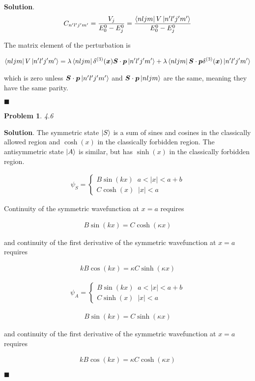 \documentclass[12pt]{article}
\newtheorem{p}{Problem}
\theoremstyle{definition}
\newenvironment{s}{%
        \begin{trivlist} \item \textbf{Solution}. }{%
            \hspace*{\fill} $\blacksquare$\end{trivlist}}%
\begin{document}
{\begin{s}
\begin{align*}
C_{n'l'j'm'} = \frac{V_{j}}{E_{0}^{0}-E_{j}^{0}} = \frac{\bra{nljm}V\ket{n'l'j'm'}}{E_{0}^{0}-E_{j}^{0}}
\end{align*}

The matrix element of the perturbation is 

\begin{align*}
\bra{nljm}V\ket{n'l'j'm'} = \lambda \bra{nljm}\delta^{(3)}(\bm{x})\bm{S}\cdot \bm{p}\ket{n'l'j'm'} + \lambda \bra{nljm}\bm{S}\cdot \bm{p}\delta^{(3)}(\bm{x})\ket{n'l'j'm'}
\end{align*}

which is zero unless $\bm{S}\cdot \bm{p}\ket{n'l'j'm'}$ and $\bm{S}\cdot \bm{p}\ket{nljm}$ are the same, meaning they have the same parity. 

\end{s}

\begin{p}
4.6
\end{p}

\begin{s}
The symmetric state $\ket{S}$ is a sum of sines and cosines in the classically allowed region and $\cosh (x)$ in the classically forbidden region. The antisymmetric state $\ket{A}$ is similar, but has $\sinh (x)$ in the classically forbidden region. 

\begin{align*}
\psi_S = \begin{cases}
  B\sin(kx)  \;\;a < |x| < a+b\\
  C\cosh(x) \;\; |x| < a
\end{cases}
\end{align*}

Continuity of the symmetric wavefunction at $x = a$ requires

\begin{align*}
B\sin(kx) = C\cosh(\kappa x)
\end{align*}

and continuity of the first derivative of the symmetric wavefunction at $x = a$ requires

\begin{align*}
kB\cos(kx) = \kappa C\sinh(\kappa x)
\end{align*}

\begin{align*}
\psi_A = \begin{cases}
  B\sin(kx)  \;\;a < |x| < a+b\\
  C\sinh(x) \;\; |x| < a
\end{cases}
\end{align*}

\begin{align*}
B\sin(kx) = C\sinh(\kappa x)
\end{align*}

and continuity of the first derivative of the symmetric wavefunction at $x = a$ requires

\begin{align*}
kB\cos(kx) = \kappa C\cosh(\kappa x)
\end{align*}


\end{s}
\end{document}

